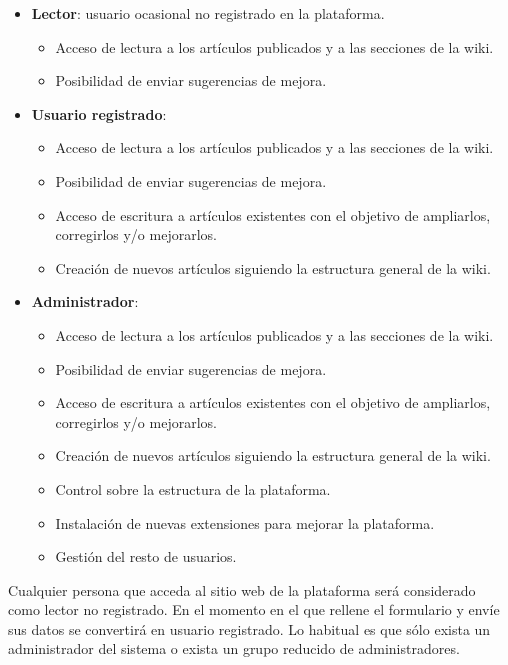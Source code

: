 \begin{itemize}
    \itemsep0em
    \item \textbf{Lector}: usuario ocasional no registrado en la plataforma.
    \begin{itemize}
        \itemsep0em
        \item Acceso de lectura a los artículos publicados y a las secciones de la wiki.
        \item Posibilidad de enviar sugerencias de mejora.
    \end{itemize}
    \item \textbf{Usuario registrado}: 
    \begin{itemize}
        \itemsep0em
        \item Acceso de lectura a los artículos publicados y a las secciones de la wiki.
        \item Posibilidad de enviar sugerencias de mejora.
        \item Acceso de escritura a artículos existentes con el objetivo de
        ampliarlos, corregirlos y/o mejorarlos.
        \item Creación de nuevos artículos siguiendo la estructura general
        de la wiki.
    \end{itemize}
    \item \textbf{Administrador}: 
    \begin{itemize}
        \itemsep0em
        \item Acceso de lectura a los artículos publicados y a las secciones de la wiki.
        \item Posibilidad de enviar sugerencias de mejora.
        \item Acceso de escritura a artículos existentes con el objetivo de
        ampliarlos, corregirlos y/o mejorarlos.
        \item Creación de nuevos artículos siguiendo la estructura general
        de la wiki.
        \item Control sobre la estructura de la plataforma.
        \item Instalación de nuevas extensiones para mejorar la plataforma.
        \item Gestión del resto de usuarios.
    \end{itemize}
\end{itemize}

Cualquier persona que acceda al sitio web de la plataforma será considerado
como lector no registrado. En el momento en el que rellene el formulario
y envíe sus datos se convertirá en usuario registrado. Lo habitual es que
sólo exista un administrador del sistema o exista un grupo reducido de
administradores.\\

